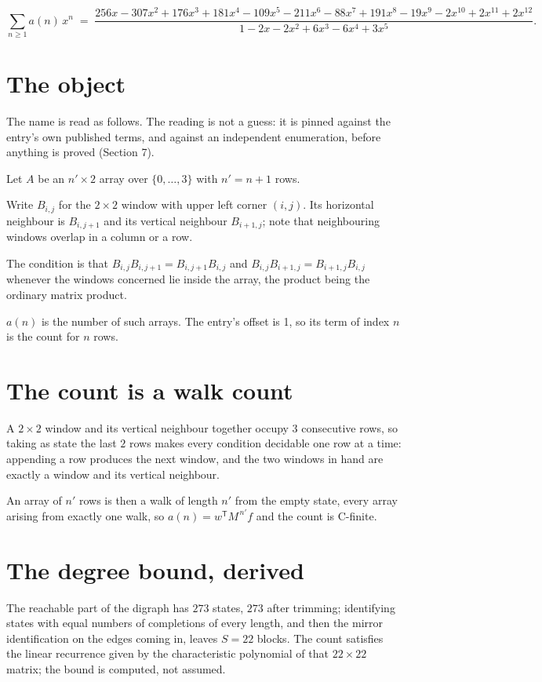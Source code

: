 \documentclass[11pt]{article}
\theoremstyle{definition}
\begin{document}
\[\sum_{n \ge 1} a(n)\,x^n \;=\; \frac{256x - 307x^{2} + 176x^{3} + 181x^{4} - 109x^{5} - 211x^{6} - 88x^{7} + 191x^{8} - 19x^{9} - 2x^{10} + 2x^{11} + 2x^{12}}{1 - 2x - 2x^{2} + 6x^{3} - 6x^{4} + 3x^{5}}.\]

\section{The object}

The name is read as follows. The reading is not a guess: it is pinned against the entry's own published terms, and against an independent enumeration, before anything is proved (Section 7).

Let $A$ be an $n' \times 2$ array over $\{0,\dots,3\}$ with $n' = n + 1$ rows.

Write $B_{i,j}$ for the $2\times2$ window with upper left corner $(i,j)$. Its horizontal neighbour is $B_{i,j+1}$ and its vertical neighbour $B_{i+1,j}$; note that neighbouring windows overlap in a column or a row.

The condition is that $B_{i,j}B_{i,j+1} = B_{i,j+1}B_{i,j}$ and $B_{i,j}B_{i+1,j} = B_{i+1,j}B_{i,j}$ whenever the windows concerned lie inside the array, the product being the ordinary matrix product.

$a(n)$ is the number of such arrays. The entry's offset is 1, so its term of index $n$ is the count for $n$ rows.

\section{The count is a walk count}

A $2\times2$ window and its vertical neighbour together occupy $3$ consecutive rows, so taking as state the last $2$ rows makes every condition decidable one row at a time: appending a row produces the next window, and the two windows in hand are exactly a window and its vertical neighbour.

An array of $n'$ rows is then a walk of length $n'$ from the empty state, every array arising from exactly one walk, so $a(n) = w^{\mathsf T}M^{\,n'}f$ and the count is C-finite.

\section{The degree bound, derived}

The reachable part of the digraph has $273$ states, $273$ after trimming; identifying states with equal numbers of completions of every length, and then the mirror identification on the edges coming in, leaves $S = 22$ blocks. The count satisfies the linear recurrence given by the characteristic polynomial of that $22\times22$ matrix; the bound is computed, not assumed.
\end{document}
